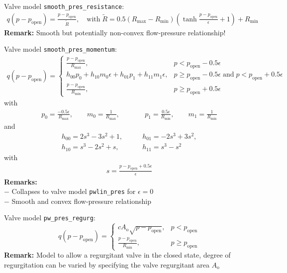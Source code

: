 \documentclass[a4paper,12pt]{report}
\begin{document}
Valve model \verb.smooth_pres_resistance.:
\begin{align}
q(p-p_{\mathrm{open}}) = \frac{p-p_{\mathrm{open}}}{\tilde{R}},\quad \text{with}\;\tilde{R} = 0.5\left(R_{\max}-R_{\min}\right)\left(\tanh\frac{p-p_{\mathrm{open}}}{\epsilon}+1\right) + R_{\min}\nonumber
\end{align}
\textbf{Remark:} Smooth but potentially non-convex flow-pressure relationship!

Valve model \verb.smooth_pres_momentum.:
\begin{align}
q(p-p_{\mathrm{open}}) = \begin{cases}\frac{p-p_{\mathrm{open}}}{R_{\max}}, & p < p_{\mathrm{open}}-0.5\epsilon \\ h_{00}p_{0} + h_{10}m_{0}\epsilon + h_{01}p_{1} + h_{11}m_{1}\epsilon, & p \geq p_{\mathrm{open}}-0.5\epsilon \;\text{and}\; p < p_{\mathrm{open}}+0.5\epsilon \\ \frac{p-p_{\mathrm{open}}}{R_{\min}}, & p \geq p_{\mathrm{open}}+0.5\epsilon  \end{cases}\nonumber
\end{align}
with
\begin{align}
p_{0}=\frac{-0.5\epsilon}{R_{\max}}, \qquad m_{0}=\frac{1}{R_{\max}}, \qquad && p_{1}=\frac{0.5\epsilon}{R_{\min}}, \qquad m_{1}=\frac{1}{R_{\min}} \nonumber
\end{align}
and
\begin{align}
h_{00}=2s^3 - 3s^2 + 1, &\qquad h_{01}=-2s^3 + 3s^2, \nonumber\\
h_{10}=s^3 - 2s^2 + s, &\qquad h_{11}=s^3 - s^2 \nonumber
\end{align}
with
\begin{align}
s=\frac{p-p_{\mathrm{open}}+0.5\epsilon}{\epsilon} \nonumber
\end{align}
\textbf{Remarks:}\\
$-$ Collapses to valve model \verb.pwlin_pres. for $\epsilon=0$\\
$-$ Smooth and convex flow-pressure relationship

Valve model \verb.pw_pres_regurg.:
\begin{equation}
q(p-p_{\mathrm{open}}) = \begin{cases} c A_{\mathrm{o}} \sqrt{p-p_{\mathrm{open}}}, & p < p_{\mathrm{open}} \\ \frac{p-p_{\mathrm{open}}}{R_{\min}}, & p \geq p_{\mathrm{open}}  \end{cases}\nonumber
\end{equation}
\textbf{Remark:} Model to allow a regurgitant valve in the closed state, degree of regurgitation can be varied by specifying the valve regurgitant area $A_{\mathrm{o}}$
\end{document}

